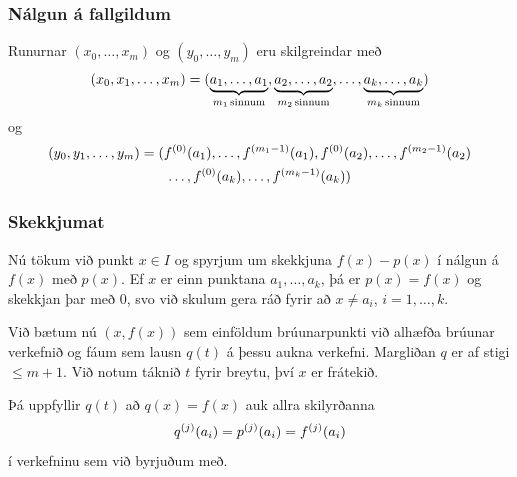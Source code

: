 \documentclass[a4paper,10pt,icelandic]{sphinxmanual}
\begin{document}
\subsubsection{Nálgun á fallgildum}
\label{kafli03:nalgun-a-fallgildum}
Runurnar \((x_0,\ldots,x_m)\) og \((y_0,\ldots,y_m)\) eru
skilgreindar með
\begin{gather}
\begin{split}(x_0,x_1,\ldots,x_m) =
  (\underbrace{a_1, \ldots, a_1}_{m_1 \, \text{sinnum}},
  \underbrace{a_2, \ldots , a_2}_{m_2 \, \text{sinnum}},
  \ldots ,
  \underbrace{a_k, \ldots , a_k}_{m_k \, \text{sinnum}})\end{split}\notag
\end{gather}
og
\begin{gather}
\begin{split}\begin{gathered}
  (y_0,y_1,\ldots,y_m) =
  (f^{(0)}(a_1), \ldots, f^{(m_1-1)}(a_1),
f^{(0)}(a_2), \ldots, f^{(m_2-1)}(a_2) \\ \ldots,
  f^{(0)}(a_k), \ldots, f^{(m_k-1)}(a_k))
  \label{bru.margfald.5}\end{gathered}\end{split}\notag
\end{gather}

\subsubsection{Skekkjumat}
\label{kafli03:id8}
Nú tökum við punkt \(x \in I\) og spyrjum um skekkjuna
\(f(x) - p(x)\) í nálgun á \(f(x)\) með \(p(x)\). Ef
\(x\) er einn punktana \(a_1, \ldots, a_k\), þá er
\(p(x) = f(x)\) og skekkjan þar með 0, svo við skulum gera ráð fyrir
að \(x \not= a_i\), \(i = 1, \ldots, k\).

Við bætum nú \((x,f(x))\) sem einföldum brúunarpunkti við alhæfða
brúunar verkefnið og fáum sem lausn \(q(t)\) á þessu aukna verkefni.
Margliðan \(q\) er af stigi \(\leq m+1\). Við notum táknið
\(t\) fyrir breytu, því \(x\) er frátekið.

Þá uppfyllir \(q(t)\) að \(q(x) = f(x)\) auk allra skilyrðanna
\begin{gather}
\begin{split}q^{(j)}(a_i) = p^{(j)}(a_i) = f^{(j)}(a_i)\end{split}\notag
\end{gather}
í verkefninu sem við byrjuðum með.
\end{document}
